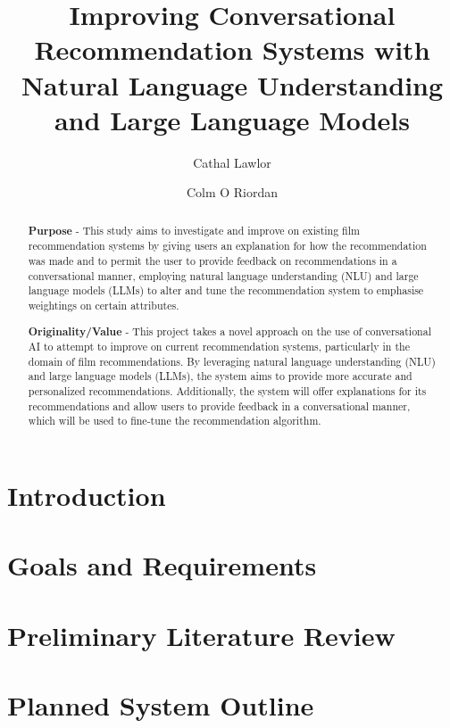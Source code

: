 \documentclass{article}
\author[1]{Cathal Lawlor}
\author[2]{Colm O Riordan}
\affil{School of Computer Science, University of Galway, Ireland}
\title{Improving Conversational Recommendation Systems with Natural Language Understanding and Large Language Models}
\begin{document}
\maketitle


\begin{abstract}
\textbf{Purpose} - 
This study aims to investigate and improve on existing film recommendation systems by giving users an explanation 
for how the recommendation was made and to permit the user to provide feedback on recommendations in a conversational manner, 
employing natural language understanding (NLU) and large language models (LLMs) to alter and tune the recommendation system to emphasise weightings on certain attributes.

\textbf{Originality/Value} - 
This project takes a novel approach on the use of conversational AI to attempt to improve on current recommendation systems, 
particularly in the domain of film recommendations. 
By leveraging natural language understanding (NLU) and large language models (LLMs), 
the system aims to provide more accurate and personalized recommendations. 
Additionally, the system will offer explanations for its recommendations and allow users to provide feedback in a conversational manner, 
which will be used to fine-tune the recommendation algorithm.

\end{abstract}
\newpage
\tableofcontents


\section{Introduction}
\label{sec:introduction}


\section{Goals and Requirements}
\label{sec:goals_requirements}


\section{Preliminary Literature Review}
\label{sec:literature_review}


\section{Planned System Outline}
\label{sec:planned_system_outline}

\end{document}

